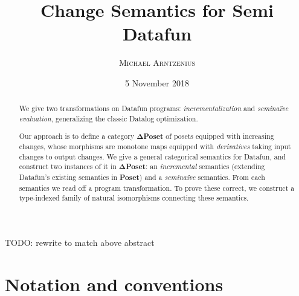 \documentclass{rntz}\usepackage[a5]{rntzgeometry}\usepackage[fullwidth=13cm,width=320pt,width=115mm]{narrow}
\title{Change Semantics for Semi\naive{} Datafun}
\author{\scshape Michael Arntzenius}
\date{5 November 2018}
\newcommand\todo[1]{{\color{ACMRed}#1}}
\newcommand\naive{na\"ive}
\newcommand\cat\textbf
\newcommand\CP{\cat{\texorpdfstring{$\boldsymbol\Delta$Poset}{DeltaPoset}}}
\newcommand\Poset{\cat{Poset}}
\newcommand\<{\mskip 4mu plus 4mu minus 1mu}
\begin{document}
\maketitle
\begin{abstract}
  We give two transformations on Datafun programs: \emph{incrementalization} and
  \emph{semi\naive{} evaluation}, generalizing the classic Datalog optimization.

  Our approach is to define a category \CP{} of posets equipped with increasing
  changes, whose morphisms are monotone maps equipped with \emph{derivatives}
  taking input changes to output changes. We give a general categorical
  semantics for Datafun, and construct two instances of it in \CP: an
  \emph{incremental} semantics (extending Datafun's existing semantics in
  \Poset) and a \emph{semi\naive} semantics. From each semantics we read off a
  program transformation. To prove these correct, we construct a type-indexed
  family of natural isomorphisms connecting these semantics.
\end{abstract}

\todo{TODO: rewrite to match above abstract}



\section{Notation and conventions}
\end{document}
